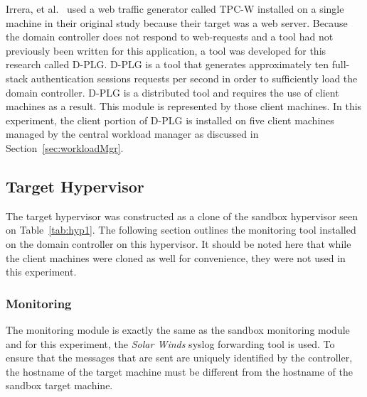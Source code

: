 Irrera, et al.~\cite{irrera2015} used a web traffic generator called TPC-W
installed on a single machine in their original study because their target was
a web server.  Because the domain controller does not respond to web-requests
and a tool had not previously been written for this application, a tool was
developed for this research called D-PLG. D-PLG is a tool that generates
approximately ten full-stack authentication sessions requests per second in
order to sufficiently load the domain controller.  D-PLG is a distributed tool
and requires the use of client machines as a result.  This module is
represented by those client machines.  In this experiment, the client portion
of D-PLG is installed on five client machines managed by the central workload
manager as discussed in Section~\ref{sec:workloadMgr}.

\subsection{Target Hypervisor} \label{sec:target}
The target hypervisor was constructed as a clone of the sandbox hypervisor seen
on Table~\ref{tab:hyp1}.  The following section outlines the monitoring tool
installed on the domain controller on this hypervisor.  It should be noted here
that while the client machines were cloned as well for convenience, they were
not used in this experiment.

\subsubsection{Monitoring} \label{sec:targetMonitoringTool}
The monitoring module is exactly the same as the sandbox monitoring module and
for this experiment, the \emph{Solar Winds} syslog forwarding tool is used.  To
ensure that the messages that are sent are uniquely identified by the
controller, the hostname of the target machine must be different from the
hostname of the sandbox target machine.

\setcounter{secnumdepth}{1}

